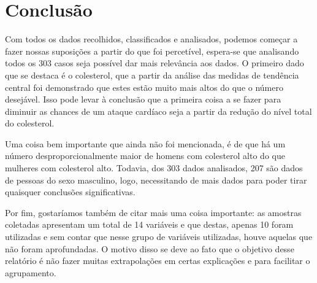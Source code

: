
\chapter*[Conclusão]{Conclusão}

    Com todos os dados recolhidos, classificados e analisados, podemos começar a fazer 
    nossas suposições a partir do que foi percetível, espera-se que analisando todos os 
    303 casos seja possível dar mais relevância aos dados. O primeiro dado que se destaca 
    é o colesterol, que a partir da análise das medidas de tendência central foi demonstrado 
    que estes estão muito mais altos do que o número desejável. Isso pode levar à conclusão 
    que a primeira coisa a se fazer para diminuir as chances de um ataque cardíaco seja a 
    partir da redução do nível total do colesterol.

    Uma coisa bem importante que ainda não foi mencionada, é de que há um número desproporcionalmente 
    maior de homens com colesterol alto do que mulheres com colesterol alto. Todavia, dos 303 dados 
    analisados, 207 são dados de pessoas do sexo masculino, logo, necessitando de mais dados para poder 
    tirar quaisquer conclusões significativas.
    
    Por fim, gostaríamos também de citar mais uma coisa importante: as amostras coletadas apresentam 
    um total de 14 variáveis e que destas, apenas 10 foram utilizadas e sem contar que nesse grupo de 
    variáveis utilizadas, houve aquelas que não foram aprofundadas. O motivo disso se deve ao fato que 
    o objetivo desse relatório é não fazer muitas extrapolações em certas explicações e para facilitar 
    o agrupamento.
    